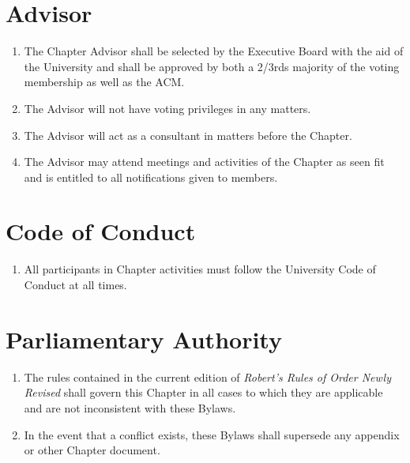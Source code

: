 \documentclass[12pt, letterpaper, oneside]{book}
\begin{document}
\chapter{Advisor}
\begin{enumerate}
    \item The Chapter Advisor shall be selected by the Executive Board with the
        aid of the University and shall be approved by both a 2/3rds majority of
        the voting membership as well as the ACM.
    \item The Advisor will not have voting privileges in any matters.
    \item The Advisor will act as a consultant in matters before the Chapter.
    \item The Advisor may attend meetings and activities of the Chapter as seen
        fit and is entitled to all notifications given to members.
\end{enumerate}

\chapter{Code of Conduct}
\begin{enumerate}
    \item All participants in Chapter activities must follow the University Code
        of Conduct at all times.
\end{enumerate}

\chapter{Parliamentary Authority}
\begin{enumerate}
    \item The rules contained in the current edition of \emph{Robert's Rules of
        Order Newly Revised} shall govern this Chapter in all cases to which
        they are applicable and are not inconsistent with these Bylaws.
    \item In the event that a conflict exists, these Bylaws shall supersede any
        appendix or other Chapter document.
\end{enumerate}
\end{document}
